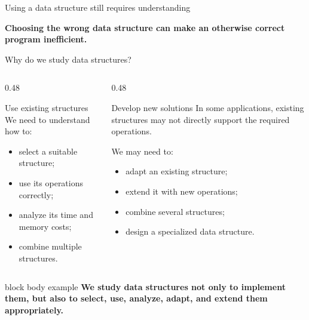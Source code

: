 \documentclass[aspectratio=169]{beamer}
\begin{document}
\begin{frame}{Using a data structure still requires understanding}
  \small

  \centering
  \textbf{\color{red}Choosing the wrong data structure can make an otherwise correct program inefficient.}
\end{frame}

\begin{frame}{Why do we study data structures?}
  \small

  \begin{columns}[T]
    \begin{column}{0.48\textwidth}
      \begin{block}{Use existing structures}
        We need to understand how to:
        \begin{itemize}
          \item select a suitable structure;
          \item use its operations correctly;
          \item analyze its time and memory costs;
          \item combine multiple structures.
        \end{itemize}
      \end{block}
    \end{column}

    \begin{column}{0.48\textwidth}
      \begin{exampleblock}{Develop new solutions}
        In some applications, existing structures may not directly support the required operations.

        \vspace{0.2cm}

        We may need to:
        \begin{itemize}
          \item adapt an existing structure;
          \item extend it with new operations;
          \item combine several structures;
          \item design a specialized data structure.
        \end{itemize}
      \end{exampleblock}
    \end{column}
  \end{columns}

  \vspace{0.4cm}

  \begin{beamercolorbox}[
      wd=\textwidth,
      sep=0.7em,
      center,
      rounded=true
    ]{block body example}
    \textbf{We study data structures not only to implement them, but also to select, use, analyze, adapt, and extend them appropriately.}
  \end{beamercolorbox}
\end{frame}
\end{document}
